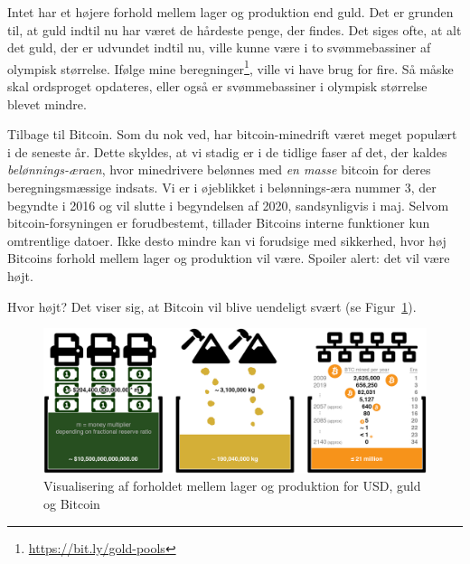 \documentclass[paper=6in:9in,pagesize=pdftex,
               headinclude=on,footinclude=on,12pt]{scrbook}
\begin{document}
Intet har et højere forhold mellem lager og produktion end guld. Det er grunden til, at guld indtil nu har været de hårdeste penge, der findes. Det siges ofte, at alt det guld, der er udvundet indtil nu, ville kunne være i to svømmebassiner af olympisk størrelse. Ifølge mine beregninger\footnote{\url{https://bit.ly/gold-pools}}, ville vi have brug for fire. Så måske skal ordsproget opdateres, eller også er svømmebassiner i olympisk størrelse blevet mindre.

Tilbage til Bitcoin. Som du nok ved, har bitcoin-minedrift været meget populært i de seneste år. Dette skyldes, at vi stadig er i de tidlige faser af det, der kaldes \textit{belønnings-æraen}, hvor minedrivere belønnes med \textit{en masse} bitcoin for deres beregningsmæssige indsats. Vi er i øjeblikket i belønnings-æra nummer 3, der begyndte i 2016 og vil slutte i begyndelsen af 2020, sandsynligvis i maj. Selvom bitcoin-forsyningen er forudbestemt, tillader Bitcoins interne funktioner kun omtrentlige datoer. Ikke desto mindre kan vi forudsige med sikkerhed, hvor høj Bitcoins forhold mellem lager og produktion vil være. Spoiler alert: det vil være højt.

Hvor højt? Det viser sig, at Bitcoin vil blive uendeligt svært (se Figur~\ref{fig:stock-to-flow-white-cropped}).

\begin{figure}
  \includegraphics{assets/images/stock-to-flow-white-cropped.png}
  \caption{Visualisering af forholdet mellem lager og produktion for USD, guld og Bitcoin}
  \label{fig:stock-to-flow-white-cropped}
\end{figure}
\end{document}
